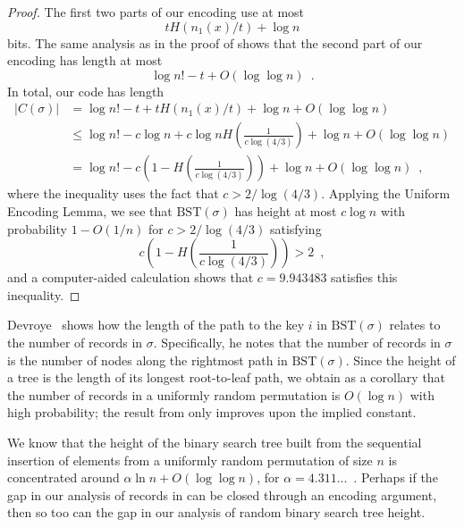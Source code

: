 \documentclass{patmorin}
\begin{document}
\begin{proof}
  The first two parts of our encoding use at most
  \[
    t H(n_1(x)/t) + \log n
  \]
  bits. The same analysis as in the proof of  shows that
  the second part of our encoding has length at most
  \[
    \log n! - t + O(\log \log n) \enspace .
  \]
  In total, our code has length
  \begin{align*}
    |C(\sigma)| &= \log n! - t + t H(n_1(x)/t) + \log n + O(\log \log n) \\
                &\le \log n! - c \log n + c \log n H\left(\frac{1}{c \log (4/3)}\right) + \log n + O(\log \log n) \\
                &= \log n! - c \left(1 - H\left(\frac{1}{c \log (4/3)}\right)\right) + \log n + O(\log \log n) \enspace ,
  \end{align*}
  where the inequality uses the fact that $c > 2/\log(4/3)$. Applying
  the Uniform Encoding Lemma, we see that $\text{BST}(\sigma)$ has
  height at most $c \log n$ with probability $1 - O(1/n)$ for
  $c > 2/\log (4/3)$ satisfying
  \[
    c \left(1 - H\left(\frac{1}{c \log (4/3)}\right)\right) > 2 \enspace ,
  \]
  and a computer-aided calculation shows that 
  $c = 9.943483$ 
  satisfies this inequality.
\end{proof}

\begin{rem}
  Devroye~\cite{devroye:records} shows how the length of the path to
  the key $i$ in $\text{BST}(\sigma)$ relates to the number of records
  in $\sigma$. Specifically, he notes that the number of records in
  $\sigma$ is the number of nodes along the rightmost path in
  $\text{BST}(\sigma)$. Since the height of a tree is the length of
  its longest root-to-leaf path, we obtain as a corollary that the
  number of records in a uniformly random permutation is $O(\log n)$
  with high probability; the result from  only
  improves upon the implied constant.
\end{rem}

\begin{rem}
  We know that the height of the binary search tree built from the
  sequential insertion of elements from a uniformly random permutation
  of size $n$ is concentrated around $\alpha \ln n + O(\log \log n)$,
  for $\alpha = 4.311\dots$~\cite{reed:height}. Perhaps if the gap in
  our analysis of records in  can be closed through an
  encoding argument, then so too can the gap in our analysis of random
  binary search tree height.
\end{rem}
\end{document}
